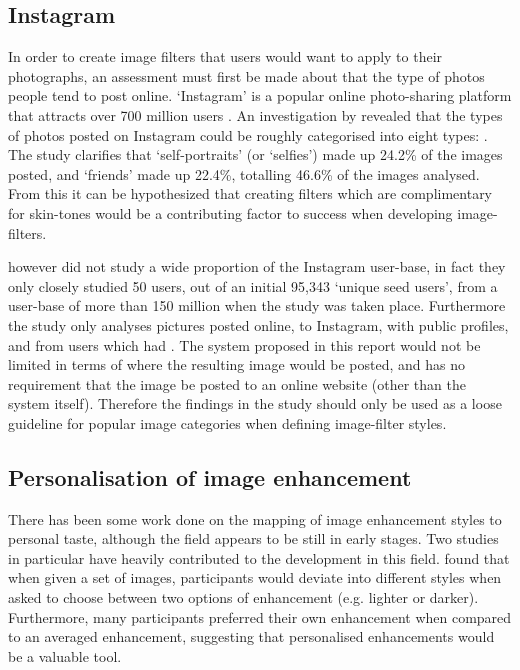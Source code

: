 \documentclass[a4paper,12pt]{report}
\begin{document}
    \subsection{Instagram} \label{sec:lit-insta}
      In order to create image filters that users would want to apply to their photographs, an assessment must first be made about that the type of photos people tend to post online. ‘Instagram’ is a popular online photo-sharing platform that attracts over 700 million users \citep{instagram2017users}. An investigation by \cite{hu2014we} revealed that the types of photos posted on Instagram could be roughly categorised into eight types: . The study clarifies that ‘self-portraits’ (or ‘selfies’) made up 24.2\% of the images posted, and ‘friends’ made up 22.4\%, totalling 46.6\% of the images analysed. From this it can be hypothesized that creating filters which are complimentary for skin-tones would be a contributing factor to success when developing image-filters.

      \cite{hu2014we} however did not study a wide proportion of the Instagram user-base, in fact they only closely studied 50 users, out of an initial 95,343 ‘unique seed users’, from a user-base of more than 150 million when the study was taken place. Furthermore the study only analyses pictures posted online, to Instagram, with public profiles, and from users which had . The system proposed in this report would not be limited in terms of where the resulting image would be posted, and has no requirement that the image be posted to an online website (other than the system itself). Therefore the findings in the study should only be used as a loose guideline for popular image categories when defining image-filter styles.

    \subsection{Personalisation of image enhancement}
      There has been some work done on the mapping of image enhancement styles to personal taste, although the field appears to be still in early stages. Two studies in particular have heavily contributed to the development in this field. \cite{kang2010personalization} found that when given a set of images, participants would deviate into different styles when asked to choose between two options of enhancement (e.g. lighter or darker). Furthermore, many participants preferred their own enhancement when compared to an averaged enhancement, suggesting that personalised enhancements would be a valuable tool.
\end{document}
